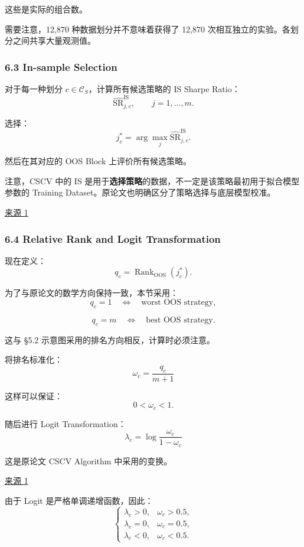 这些是实际的组合数。

需要注意，12,870 种数据划分并不意味着获得了 12,870 次相互独立的实验。各划分之间共享大量观测值。

\hypertarget{part-4-71-0001-in-sample-selection}{%
\subsubsection{6.3 In-sample Selection}\label{part-4-71-0001-in-sample-selection}}

对于每一种划分 \(c\in\mathcal C_S\)，计算所有候选策略的 IS Sharpe Ratio：
\[\widehat{\mathrm{SR}}_{j,c}^{\mathrm{IS}},
\qquad j=1,\ldots,m.\]

选择：
\[j_c^*
=
\arg\max_j
\widehat{\mathrm{SR}}_{j,c}^{\mathrm{IS}}.\]

然后在其对应的 OOS Block 上评价所有候选策略。

注意，CSCV 中的 IS 是用于\textbf{选择策略}的数据，不一定是该策略最初用于拟合模型参数的 Training Dataset。原论文也明确区分了策略选择与底层模型校准。

\href{https://www.davidhbailey.com/dhbpapers/backtest-prob.pdf}{来源 1}

\hypertarget{part-4-71-0001-relative-rank-and-logit-transformation}{%
\subsubsection{6.4 Relative Rank and Logit Transformation}\label{part-4-71-0001-relative-rank-and-logit-transformation}}

现在定义：
\[q_c
=
\operatorname{Rank}_{\mathrm{OOS}}(j_c^*).\]

为了与原论文的数学方向保持一致，本节采用：
\[q_c=1
\quad\Longleftrightarrow\quad
\text{worst OOS strategy},\]

\[q_c=m
\quad\Longleftrightarrow\quad
\text{best OOS strategy}.\]

这与 §5.2 示意图采用的排名方向相反，计算时必须注意。

将排名标准化：
\[\boxed{
\omega_c=\frac{q_c}{m+1}
}\]

这样可以保证：
\[0<\omega_c<1.\]

随后进行 Logit Transformation：
\[\boxed{
\lambda_c
=
\log\frac{\omega_c}{1-\omega_c}
}\]

这是原论文 CSCV Algorithm 中采用的变换。

\href{https://www.davidhbailey.com/dhbpapers/backtest-prob.pdf}{来源 1}

由于 Logit 是严格单调递增函数，因此：
\[\begin{cases}
\lambda_c>0,&\omega_c>0.5,\\
\lambda_c=0,&\omega_c=0.5,\\
\lambda_c<0,&\omega_c<0.5.
\end{cases}\]

